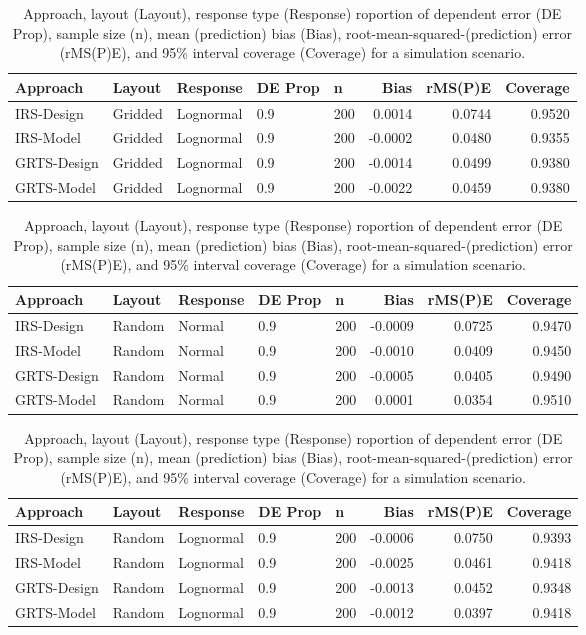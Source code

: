 \documentclass[]{elsarticle} %
\begin{document}
\begin{table}[ht]
\centering
\begin{tabular}{lllllrrr}
  \hline
Approach & Layout & Response & DE Prop & n & Bias & rMS(P)E & Coverage \\ 
  \hline
IRS-Design & Gridded & Lognormal & 0.9 & 200 & 0.0014 & 0.0744 & 0.9520 \\ 
  IRS-Model & Gridded & Lognormal & 0.9 & 200 & -0.0002 & 0.0480 & 0.9355 \\ 
  GRTS-Design & Gridded & Lognormal & 0.9 & 200 & -0.0014 & 0.0499 & 0.9380 \\ 
  GRTS-Model & Gridded & Lognormal & 0.9 & 200 & -0.0022 & 0.0459 & 0.9380 \\ 
   \hline
\end{tabular}
\caption{Approach, layout (Layout), response type (Response) roportion of dependent error (DE Prop), sample size (n), mean (prediction) bias (Bias), root-mean-squared-(prediction) error (rMS(P)E), and 95\% interval coverage (Coverage) for a simulation scenario.} 
\end{table}
\begin{table}[ht]
\centering
\begin{tabular}{lllllrrr}
  \hline
Approach & Layout & Response & DE Prop & n & Bias & rMS(P)E & Coverage \\ 
  \hline
IRS-Design & Random & Normal & 0.9 & 200 & -0.0009 & 0.0725 & 0.9470 \\ 
  IRS-Model & Random & Normal & 0.9 & 200 & -0.0010 & 0.0409 & 0.9450 \\ 
  GRTS-Design & Random & Normal & 0.9 & 200 & -0.0005 & 0.0405 & 0.9490 \\ 
  GRTS-Model & Random & Normal & 0.9 & 200 & 0.0001 & 0.0354 & 0.9510 \\ 
   \hline
\end{tabular}
\caption{Approach, layout (Layout), response type (Response) roportion of dependent error (DE Prop), sample size (n), mean (prediction) bias (Bias), root-mean-squared-(prediction) error (rMS(P)E), and 95\% interval coverage (Coverage) for a simulation scenario.} 
\end{table}
\begin{table}[ht]
\centering
\begin{tabular}{lllllrrr}
  \hline
Approach & Layout & Response & DE Prop & n & Bias & rMS(P)E & Coverage \\ 
  \hline
IRS-Design & Random & Lognormal & 0.9 & 200 & -0.0006 & 0.0750 & 0.9393 \\ 
  IRS-Model & Random & Lognormal & 0.9 & 200 & -0.0025 & 0.0461 & 0.9418 \\ 
  GRTS-Design & Random & Lognormal & 0.9 & 200 & -0.0013 & 0.0452 & 0.9348 \\ 
  GRTS-Model & Random & Lognormal & 0.9 & 200 & -0.0012 & 0.0397 & 0.9418 \\ 
   \hline
\end{tabular}
\caption{Approach, layout (Layout), response type (Response) roportion of dependent error (DE Prop), sample size (n), mean (prediction) bias (Bias), root-mean-squared-(prediction) error (rMS(P)E), and 95\% interval coverage (Coverage) for a simulation scenario.} 
\end{table}
\end{document}
